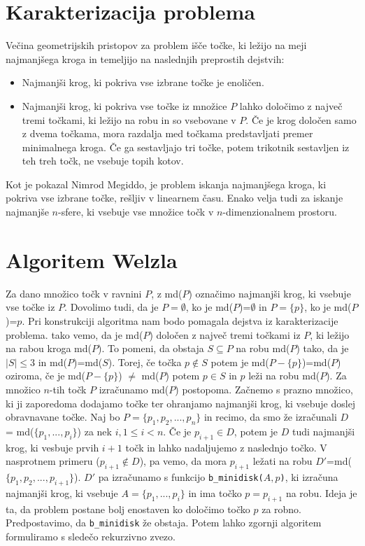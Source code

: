 \documentclass[a4paper]{article}
\begin{document}
\section{Karakterizacija problema}

Večina geometrijskih pristopov za problem išče točke, ki ležijo na meji
najmanjšega kroga in temeljijo na naslednjih preprostih dejstvih:
\begin{itemize}
\item Najmanjši krog, ki pokriva vse izbrane točke je enoličen.
\item Najmanjši krog, ki pokriva vse točke iz množice $P$ lahko določimo z
največ tremi točkami, ki ležijo na robu in so vsebovane v $P$. Če je
krog določen samo z dvema točkama, mora razdalja med točkama
predstavljati premer minimalnega kroga. Če ga sestavljajo tri
točke, potem trikotnik sestavljen iz teh treh točk, ne vsebuje
topih kotov.
\end{itemize}

Kot je pokazal Nimrod Megiddo, je problem iskanja najmanjšega kroga, ki
pokriva vse izbrane točke, rešljiv v linearnem času. Enako velja tudi za
iskanje najmanjše $n$-sfere, ki vsebuje vse množice točk v $n$-dimenzionalnem
prostoru.


\section{Algoritem Welzla}

Za dano množico točk v ravnini $P$, z md($P$) označimo najmanjši krog, ki vsebuje vse točke iz $P$. Dovolimo tudi, da je $P=\emptyset$, ko je md($P$)=$\emptyset$ in $P=\{p\}$, ko je md($P$)=$p$. 
\newline Pri konstrukciji algoritma nam bodo pomagala dejstva iz karakterizacije problema. tako vemo, da je md($P$) določen z največ tremi točkami iz $P$, ki ležijo na
rabou kroga md($P$). To pomeni, da obstaja $S \subseteq P$ na robu md($P$) tako, da je $|S| \leq 3$ in md($P$)=md($S$). Torej, če točka $p \notin S$  potem je md($P-\{p\}$)=md($P$) oziroma, če je md($P-\{p\}$) $\neq$ md($P$) potem $p \in S$ in $p$ leži na robu md($P$).
\newline Za množico $n$-tih točk $P$ izračunamo md($P$) postopoma. Začnemo s prazno množico, ki ji zaporedoma dodajamo točke ter ohranjamo najmanjši krog, ki vsebuje doslej obravnavane točke.
Naj bo $P=\{p_1,p_2,...,p_n\}$ in recimo, da smo že izračunali $D$ = md($\{p_1,...,p_i\}$) za nek $i, 1 \leq i < n$. Če je $p_{i+1} \in D$, potem je $D$ tudi najmanjši krog, ki vesbuje prvih $i+1$ točk in lahko nadaljujemo z naslednjo točko. V nasprotnem primeru ($p_{i+1} \notin D$), pa vemo, da mora $p_{i+1}$ ležati na robu $D'$=md($\{p_1,p_2,...,p_{i+1}\}$). $D'$ pa izračunamo s funkcijo \texttt{b\_minidisk($A,p$)}, ki izračuna najmanjši krog, ki vsebuje $A=\{p_1,...,p_i\}$  in ima točko $p=p_{i+1}$ na robu. 
Ideja je ta, da problem postane bolj enostaven ko določimo točko $p$ za robno.
Predpostavimo, da \texttt{b\_minidisk} že obstaja. Potem lahko zgornji algoritem formuliramo s sledečo rekurzivno zvezo.
\end{document}
